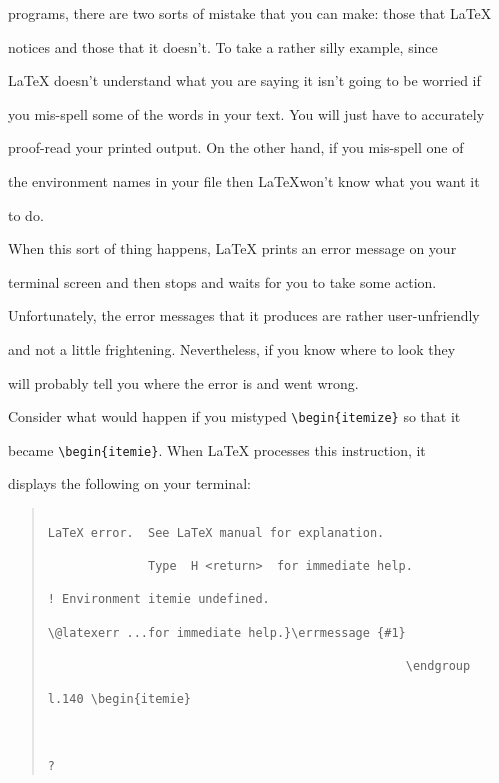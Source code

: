 programs, there are two sorts of mistake that you can make: those that \LaTeX{}

notices and those that it doesn't.  To take a rather silly example, since

\LaTeX{} doesn't understand what you are saying it isn't going to be worried if

you mis-spell some of the words in your text.  You will just have to accurately

proof-read your printed output.  On the other hand, if you mis-spell one of

the environment names in your file then \LaTeX won't know what you want it

to do.



When this sort of thing happens, \LaTeX{} prints an error message on your

terminal screen and then stops and waits for you to take some action.

Unfortunately, the error messages that it produces are rather user-unfriendly

and not a little frightening.  Nevertheless, if you know where to look they

will probably tell you where the error is and went wrong.



Consider what would happen if you mistyped \verb|\begin{itemize}| so that it

became \verb|\begin{itemie}|.  When \LaTeX{} processes this instruction, it

displays the following on your terminal:

\begin{quote}\footnotesize\begin{verbatim}

LaTeX error.  See LaTeX manual for explanation.

              Type  H <return>  for immediate help.

! Environment itemie undefined.

\@latexerr ...for immediate help.}\errmessage {#1}

                                                  \endgroup

l.140 \begin{itemie}



?

\end{verbatim}\end{quote}

